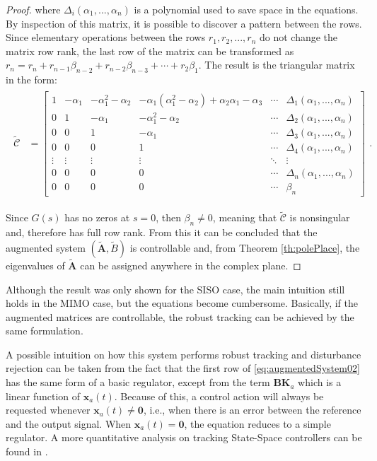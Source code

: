 \documentclass[a4paper,11pt]{book}
\numberwithin{figure}{chapter}
\numberwithin{equation}{chapter}
\numberwithin{table}{chapter}
\theoremstyle{definition}
\begin{document}
\begin{proof}
    \noindent where $\Delta_i(\alpha_1,...,\alpha_n)$ is a polynomial used to save space in the equations. By inspection of this matrix, it is possible to discover a pattern between the rows. Since elementary operations between the rows ${r_1, r_2, ..., r_n}$ do not change the matrix row rank, the last row of the matrix can be transformed as $r_n = r_n + r_{n-1}\beta_{n-2} + r_{n-2}\beta_{n-3} + \cdots + r_{2}\beta_{1}$. The result is the triangular matrix in the form:
    \begin{align}
    \begin{split}
        \tilde{\bm{\mathcal{C}}} &= 
            \begin{bmatrix}
                1 & -\alpha_1 & -\alpha_1^2 - \alpha_2 & -\alpha_1(\alpha_1^2 - \alpha_2) + \alpha_2 \alpha_1 - \alpha_3 & \cdots & \Delta_1(\alpha_1,...,\alpha_n) \\
                0 & 1 & -\alpha_1 & -\alpha_1^2 - \alpha_2  & \cdots & \Delta_2(\alpha_1,...,\alpha_n) \\
                0 & 0 & 1 & -\alpha_1  & \cdots & \Delta_3(\alpha_1,...,\alpha_n) \\
                0 & 0 & 0 & 1 &  \cdots & \Delta_4(\alpha_1,...,\alpha_n) \\
                \vdots & \vdots & \vdots & \vdots & \ddots & \vdots \\
                0 & 0 & 0 & 0 & \cdots & \Delta_{n}(\alpha_1,...,\alpha_n) \\
                0 & 0 & 0 & 0  & \cdots & \beta_n
            \end{bmatrix}
    \end{split}
    .\end{align}
    
    Since $G(s)$ has no zeros at $s = 0$, then $\beta_n \neq 0$, meaning that $\tilde{\bm{\mathcal{C}}}$ is nonsingular and, therefore has full row rank. From this it can be concluded that the augmented system $(\tilde{\bm{A}}, \tilde{B})$ is controllable and, from Theorem \ref{th:polePlace}, the eigenvalues of $\tilde{\bm{A}}$ can be assigned anywhere in the complex plane.
\end{proof}

Although the result was only shown for the SISO case, the main intuition still holds in the MIMO case, but the equations become cumbersome. Basically, if the augmented matrices are controllable, the robust tracking can be achieved by the same formulation. 

A possible intuition on how this system performs robust tracking and disturbance rejection can be taken from the fact that the first row of \eqref{eq:augmentedSystem02} has the same form of a basic regulator, except from the term $\bm{B} \bm{K}_a$ which is a linear function of $\bm{x}_a(t)$. Because of this, a control action will always be requested whenever $\bm{x}_a(t) \neq \bm{0}$, i.e., when there is an error between the reference and the output signal. When $\bm{x}_a(t) = \bm{0}$, the equation reduces to a simple regulator. A more quantitative analysis on tracking State-Space controllers can be found in \cite{Franklin:2018}. 
\end{document}
